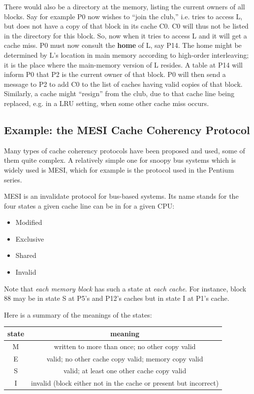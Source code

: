 There would also be a directory at the memory, listing the current
owners of all blocks. Say for example P0 now wishes to ``join the
club,'' i.e. tries to access L, but does not have a copy of that block
in its cache C0.  C0 will thus not be listed in the directory for this
block.  So, now when  it tries to access L and it will get a cache miss.
P0 must now consult the {\bf home} of L, say P14.  The home might be
determined by L's location in main memory according to high-order
interleaving; it is the place where the main-memory version of L
resides.  A table at P14 will inform P0 that P2 is the current owner of
that block. P0 will then send a message to P2 to add C0 to the list of
caches having valid copies of that block.  Similarly, a cache might
``resign'' from the club, due to that cache line being replaced, e.g. in
a LRU setting, when some other cache miss occurs. 

\subsection{Example: the MESI Cache Coherency Protocol}

Many types of cache coherency protocols have been proposed and used,
some of them quite complex. A relatively simple one for snoopy bus
systems which is widely used is MESI, which for example is the protocol
used in the Pentium series.

MESI is an invalidate protocol for bus-based systems.  Its name stands
for the four states a given cache line can be in for a given CPU: 

\begin{itemize}

\item Modified
\item Exclusive
\item Shared
\item Invalid

\end{itemize}

Note that {\it each memory block} has such a state at {\it each cache}.
For instance, block 88 may be in state S at P5's and P12's caches but in
state I at P1's cache.

Here is a summary of the meanings of the states:


\begin{tabular}{|c|c|}
\hline 
state&
 meaning\\
\hline 
M&
 written to more than once; no other copy valid\\
\hline 
E&
 valid; no other cache copy valid; memory copy valid\\
\hline 
S&
 valid; at least one other cache copy valid\\
\hline 
I&
 invalid (block either not in the cache or present but incorrect) \\
\hline 
\end{tabular}

